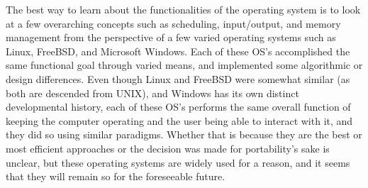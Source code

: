 \documentclass[10pt,draftclsnofoot,onecolumn]{IEEEtran}
\begin{document}
    The best way to learn about the functionalities of the operating system is to look at a few overarching concepts such as scheduling, input/output, and memory management from the perspective of a few varied operating systems such as Linux, FreeBSD, and Microsoft Windows. Each of these OS's accomplished the same functional goal through varied means, and implemented some algorithmic or design differences. Even though Linux and FreeBSD were somewhat similar (as both are descended from UNIX), and Windows has its own distinct developmental history, each of these OS's performs the same overall function of keeping the computer operating and the user being able to interact with it, and they did so using similar paradigms. Whether that is because they are the best or most efficient approaches or the decision was made for portability's sake is unclear, but these operating systems are widely used for a reason, and it seems that they will remain so for the foreseeable future.
	\newpage
    
	
\end{document}
